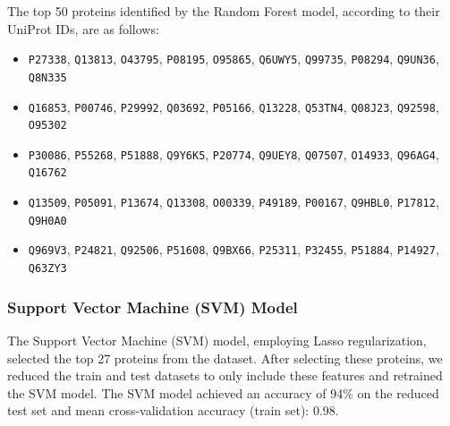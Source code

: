 \documentclass[a4paper,12pt]{article}
\begin{document}
The top 50 proteins identified by the Random Forest model, according to their UniProt IDs, are as follows:
\begin{itemize}
	\item \texttt{P27338}, \texttt{Q13813}, \texttt{O43795}, \texttt{P08195}, \texttt{O95865}, \texttt{Q6UWY5}, \texttt{Q99735}, \texttt{P08294}, \texttt{Q9UN36}, \texttt{Q8N335}
	\item \texttt{Q16853}, \texttt{P00746}, \texttt{P29992}, \texttt{Q03692}, \texttt{P05166}, \texttt{Q13228}, \texttt{Q53TN4}, \texttt{Q08J23}, \texttt{Q92598}, \texttt{O95302}
	\item \texttt{P30086}, \texttt{P55268}, \texttt{P51888}, \texttt{Q9Y6K5}, \texttt{P20774}, \texttt{Q9UEY8}, \texttt{Q07507}, \texttt{O14933}, \texttt{Q96AG4}, \texttt{Q16762}
	\item \texttt{Q13509}, \texttt{P05091}, \texttt{P13674}, \texttt{Q13308}, \texttt{O00339}, \texttt{P49189}, \texttt{P00167}, \texttt{Q9HBL0}, \texttt{P17812}, \texttt{Q9H0A0}
	\item \texttt{Q969V3}, \texttt{P24821}, \texttt{Q92506}, \texttt{P51608}, \texttt{Q9BX66}, \texttt{P25311}, \texttt{P32455}, \texttt{P51884}, \texttt{P14927}, \texttt{Q63ZY3}
\end{itemize}


\subsubsection{Support Vector Machine (SVM) Model}
The Support Vector Machine (SVM) model, employing Lasso regularization, selected the top 27 proteins from the dataset. After selecting these proteins, we reduced the train and test datasets to only include these features and retrained the SVM model. The SVM model achieved an accuracy of 94\% on the reduced test set and mean cross-validation accuracy (train set): 0.98.
\end{document}

